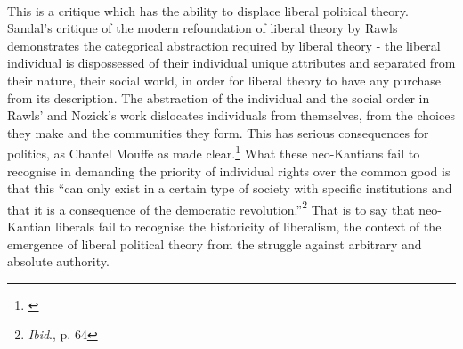 \documentclass[12pt,a4paper,titlepage]{article}
\begin{document}
\paragraph{}This is a critique which has the ability to displace liberal political theory. Sandal's critique of the modern refoundation of liberal theory by Rawls demonstrates the categorical abstraction required by liberal theory - the liberal individual is dispossessed of their individual unique attributes and separated from their nature, their social world, in order for liberal theory to have any purchase from its description. The abstraction of the individual and the social order in Rawls' and Nozick's work dislocates individuals from themselves, from the choices they make and the communities they form. This has serious consequences for politics, as Chantel Mouffe as made clear.\footnote{\cite[p. 65]{mouffe:2005rp}} What these neo-Kantians fail to recognise in demanding the priority of individual rights over the common good is that this ``can only exist in a certain type of society with specific institutions and that it is a consequence of the democratic revolution.''\footnote{\textit{Ibid}., p. 64} That is to say that neo-Kantian liberals fail to recognise the historicity of liberalism, the context of the emergence of liberal political theory from the struggle against arbitrary and absolute authority.
\end{document}
